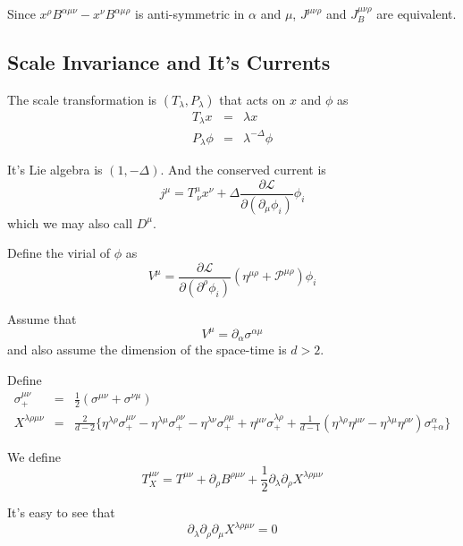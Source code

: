 \documentclass[12pt]{book}
\begin{document}
	Since $x^\rho B^{\alpha\mu\nu}-x^\nu B^{\alpha\mu\rho}$ is anti-symmetric in $\alpha$ and $\mu$, $J^{\mu\nu\rho}$ and $J_B^{\mu\nu\rho}$ are equivalent.
	
	\subsection{Scale Invariance and It's Currents}
	
	The scale transformation is $(T_\lambda,P_\lambda)$ that acts on $x$ and $\phi$ as
	\begin{eqnarray}
		T_\lambda x&=&\lambda x\\
		P_\lambda \phi&=&\lambda^{-\Delta}\phi
	\end{eqnarray}
	
	It's Lie algebra is $(1,-\Delta)$. And the conserved current is
	\begin{equation}
		j^\mu=T^\mu_{\ \nu}x^\nu+\Delta\frac{\partial\mathcal{L}}{\partial(\partial_\mu\phi_i)}\phi_i 
	\end{equation}
	which we may also call $D^\mu$.
	
	Define the virial of $\phi$ as
	\begin{equation}
		V^\mu=\frac{\partial \mathcal L}{\partial (\partial^\rho\phi_i)}(\eta^{\mu\rho}+\mathcal P^{\mu\rho})\phi_i
	\end{equation}
	
	Assume that 
	\begin{equation}
		V^\mu=\partial_\alpha\sigma^{\alpha\mu}
	\end{equation}
	and also assume the dimension of the space-time is $d>2$.
	
	Define
	\begin{eqnarray}
		\sigma_+^{\mu\nu}&=&\frac 12 (\sigma^{\mu\nu}+\sigma^{\nu\mu})\\
		X^{\lambda\rho\mu\nu}&=&\frac 2{d-2}\big\{\eta^{\lambda\rho}\sigma_+^{\mu\nu}-\eta^{\lambda\mu}\sigma_+^{\rho\nu}-\eta^{\lambda\nu}\sigma_+^{\rho\mu}+\eta^{\mu\nu}\sigma_+^{\lambda\rho}+\frac 1{d-1}(\eta^{\lambda\rho}\eta^{\mu\nu}-\eta^{\lambda\mu}\eta^{\rho\nu})\sigma^\alpha_{+\alpha}\big\}
	\end{eqnarray}
	
	We define
	\begin{equation}
		T_X^{\mu\nu}=T^{\mu\nu}+\partial_\rho B^{\rho\mu\nu}+\frac 12 \partial_\lambda\partial_\rho X^{\lambda\rho\mu\nu}
	\end{equation}
	
	It's easy to see that
	\begin{equation}
		\partial_\lambda\partial_\rho\partial_\mu X^{\lambda\rho\mu\nu}=0
	\end{equation}
	
\end{document}
